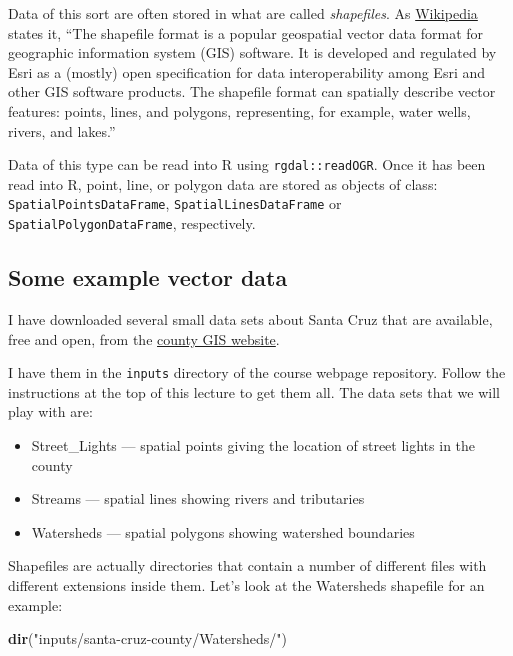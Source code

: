 \documentclass[]{book}
\newenvironment{Shaded}{\begin{snugshade}}{\end{snugshade}}
\newcommand{\KeywordTok}[1]{\textcolor[rgb]{0.13,0.29,0.53}{\textbf{{#1}}}}
\newcommand{\StringTok}[1]{\textcolor[rgb]{0.31,0.60,0.02}{{#1}}}
\newcommand{\NormalTok}[1]{{#1}}
\providecommand{\tightlist}{%
  \setlength{\itemsep}{0pt}\setlength{\parskip}{0pt}}
\theoremstyle{definition}
\theoremstyle{definition}
\theoremstyle{remark}
\begin{document}
Data of this sort are often stored in what are called \emph{shapefiles}.
As \href{https://en.wikipedia.org/wiki/Shapefile}{Wikipedia} states it,
``The shapefile format is a popular geospatial vector data format for
geographic information system (GIS) software. It is developed and
regulated by Esri as a (mostly) open specification for data
interoperability among Esri and other GIS software products. The
shapefile format can spatially describe vector features: points, lines,
and polygons, representing, for example, water wells, rivers, and
lakes.''

Data of this type can be read into R using \texttt{rgdal::readOGR}. Once
it has been read into R, point, line, or polygon data are stored as
objects of class: \texttt{SpatialPointsDataFrame},
\texttt{SpatialLinesDataFrame} or \texttt{SpatialPolygonDataFrame},
respectively.

\subsection{Some example vector data}\label{some-example-vector-data}

I have downloaded several small data sets about Santa Cruz that are
available, free and open, from the
\href{http://www.co.santa-cruz.ca.us/Departments/GeographicInformationSystems(GIS).aspx}{county
GIS website}.

I have them in the \texttt{inputs} directory of the course webpage
repository. Follow the instructions at the top of this lecture to get
them all. The data sets that we will play with are:

\begin{itemize}
\tightlist
\item
  Street\_Lights --- spatial points giving the location of street lights
  in the county
\item
  Streams --- spatial lines showing rivers and tributaries
\item
  Watersheds --- spatial polygons showing watershed boundaries
\end{itemize}

Shapefiles are actually directories that contain a number of different
files with different extensions inside them. Let's look at the
Watersheds shapefile for an example:

\begin{Shaded}
\begin{Highlighting}[]
\KeywordTok{dir}\NormalTok{(}\StringTok{"inputs/santa-cruz-county/Watersheds/"}\NormalTok{)}
\end{Highlighting}
\end{Shaded}
\end{document}
